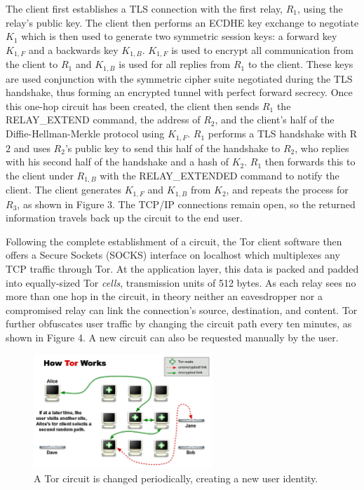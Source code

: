 The client first establishes a TLS connection with the first relay, $R_{1}$, using the relay's public key. The client then performs an ECDHE key exchange to negotiate $K_{1}$ which is then used to generate two symmetric session keys: a forward key $K_{1,F}$ and a backwards key $K_{1,B}$. $K_{1,F}$ is used to encrypt all communication from the client to $R_{1}$ and $K_{1,B}$ is used for all replies from $R_{1}$ to the client. These keys are used conjunction with the symmetric cipher suite negotiated during the TLS handshake, thus forming an encrypted tunnel with perfect forward secrecy. Once this one-hop circuit has been created, the client then sends $R_{1}$ the RELAY\_EXTEND command, the address of $R_{2}$, and the client's half of the Diffie-Hellman-Merkle protocol using $K_{1,F}$. $R_{1}$ performs a TLS handshake with R${2}$ and uses $R_{2}$'s public key to send this half of the handshake to $R_{2}$, who replies with his second half of the handshake and a hash of $K_{2}$. $R_{1}$ then forwards this to the client under $R_{1,B}$ with the RELAY\_EXTENDED command to notify the client. The client generates $K_{1,F}$ and $K_{1,B}$ from $K_{2}$, and repeats the process for $R_{3}$,\cite{Ling2012} as shown in Figure 3. The TCP/IP connections remain open, so the returned information travels back up the circuit to the end user.

Following the complete establishment of a circuit, the Tor client software then offers a Secure Sockets (SOCKS) interface on localhost which multiplexes any TCP traffic through Tor. At the application layer, this data is packed and padded into equally-sized Tor \textit{cells}, transmission units of 512 bytes. As each relay sees no more than one hop in the circuit, in theory neither an eavesdropper nor a compromised relay can link the connection's source, destination, and content. Tor further obfuscates user traffic by changing the circuit path every ten minutes,\cite{McCoy2008} as shown in Figure 4. A new circuit can also be requested manually by the user.

\begin{figure}[htbp]
	\centering
	\includegraphics[width=0.6\textwidth]{images/circuit-change-1-4.png}
	\caption{A Tor circuit is changed periodically, creating a new user identity.}
	\label{fig:figure3}
\end{figure}

